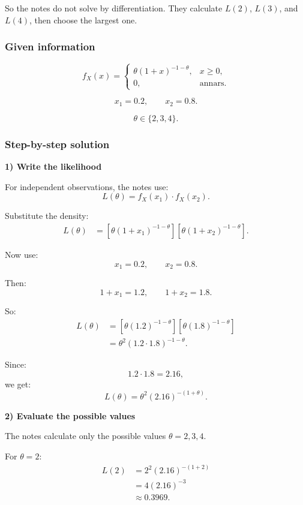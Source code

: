 \documentclass[10pt]{article}
\begin{document}
So the notes do not solve by differentiation.
They calculate \(L(2)\), \(L(3)\), and \(L(4)\),
then choose the largest one.

\subsubsection*{Given information}

\[
f_X(x)=
\begin{cases}
\theta(1+x)^{-1-\theta},
& x\ge 0,\\
0,
& \text{annars}.
\end{cases}
\]

\[
x_1=0.2,
\qquad
x_2=0.8.
\]

\[
\theta\in\{2,3,4\}.
\]

\subsubsection*{Step-by-step solution}

\textbf{1) Write the likelihood}

For independent observations, the notes use:
\[
L(\theta)
=
f_X(x_1)\cdot f_X(x_2).
\]

Substitute the density:
\begin{align*}
L(\theta)
&=
\left[
\theta(1+x_1)^{-1-\theta}
\right]
\left[
\theta(1+x_2)^{-1-\theta}
\right].
\end{align*}

Now use:
\[
x_1=0.2,
\qquad
x_2=0.8.
\]

Then:
\[
1+x_1=1.2,
\qquad
1+x_2=1.8.
\]

So:
\begin{align*}
L(\theta)
&=
\left[
\theta(1.2)^{-1-\theta}
\right]
\left[
\theta(1.8)^{-1-\theta}
\right]
\\[2mm]
&=
\theta^2
\left(1.2\cdot 1.8\right)^{-1-\theta}.
\end{align*}

Since:
\[
1.2\cdot 1.8=2.16,
\]
we get:
\[
L(\theta)
=
\theta^2(2.16)^{-(1+\theta)}.
\]

\textbf{2) Evaluate the possible values}

The notes calculate only the possible values
\(\theta=2,3,4\).

For \(\theta=2\):
\begin{align*}
L(2)
&=
2^2(2.16)^{-(1+2)}
\\[2mm]
&=
4(2.16)^{-3}
\\[2mm]
&\approx 0.3969.
\end{align*}
\end{document}

